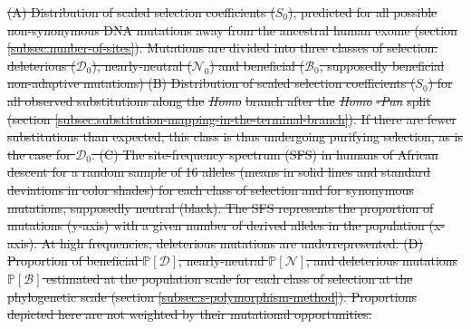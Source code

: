 \documentclass{article} %
\newcommand{\proba}{\mathbb{P}}
\newcommand{\Sphy}{S_{0}}
\newcommand{\SphyDel}{\mathcal{D}_0}
\newcommand{\SphyNeu}{\mathcal{N}_0}
\newcommand{\SphyBen}{\mathcal{B}_0}
\newcommand{\SpopDel}{\mathcal{D}}
\newcommand{\SpopNeu}{\mathcal{N}}
\newcommand{\SpopBen}{\mathcal{B}}
\newcommand{\ProbaPopDel}{\proba [ \SpopDel]}
\newcommand{\ProbaPopNeu}{\proba [ \SpopNeu ]}
\newcommand{\ProbaPopBen}{\proba [ \SpopBen ]}
\providecommand{\DIFdeltex}[1]{{\protect\color{red}\sout{#1}}}                      %
\providecommand{\DIFdelbegin}{} %
\providecommand{\DIFdelFL}[1]{\DIFdel{#1}} %
\providecommand{\DIFdel}[1]{\texorpdfstring{\DIFdeltex{#1}}{}} %
\newcommand{\DIFscaledelfig}{0.5}
\newlength{\DIFdelgraphicswidth} %
\newlength{\DIFdelgraphicsheight} %
\newcommand{\DIFdelincludegraphics}[2][]{%
\sbox{\DIFdelgraphicsbox}{\DIFOincludegraphics[#1]{#2}}%
\settoboxwidth{\DIFdelgraphicswidth}{\DIFdelgraphicsbox} %
\settoboxtotalheight{\DIFdelgraphicsheight}{\DIFdelgraphicsbox} %
\scalebox{\DIFscaledelfig}{%
\parbox[b]{\DIFdelgraphicswidth}{\usebox{\DIFdelgraphicsbox}\\[-\baselineskip] \rule{\DIFdelgraphicswidth}{0em}}\llap{\resizebox{\DIFdelgraphicswidth}{\DIFdelgraphicsheight}{%
\setlength{\unitlength}{\DIFdelgraphicswidth}%
\begin{picture}(1,1)%
\thicklines\linethickness{2pt} %
{\color[rgb]{1,0,0}\put(0,0){\framebox(1,1){}}}%
{\color[rgb]{1,0,0}\put(0,0){\line( 1,1){1}}}%
{\color[rgb]{1,0,0}\put(0,1){\line(1,-1){1}}}%
\end{picture}%
}\hspace*{3pt}}} %
} %
\DeclareRobustCommand{\DIFdelbegin}{\DIFOdelbegin \let\includegraphics\DIFdelincludegraphics} %
\begin{document}
    \DIFdelbegin %
{%
\DIFdelFL{(A) Distribution of scaled selection coefficients ($\Sphy$), predicted for all possible non-synonymous DNA mutations away from the ancestral human exome (section \ref{subsec:nunber-of-sites}).
              Mutations are divided into three classes of selection: deleterious ($\SphyDel$), nearly-neutral ($\SphyNeu$) and beneficial ($\SphyBen$, supposedly beneficial non-adaptive mutations)
              (B) Distribution of scaled selection coefficients ($\Sphy$) for all observed substitutions along the }\textit{\DIFdelFL{Homo}} %
\DIFdelFL{branch after the }\textit{\DIFdelFL{Homo}}%
\DIFdelFL{-}\textit{\DIFdelFL{Pan}} %
\DIFdelFL{split (section \ref{subsec:substitution-mapping-in-the-terminal-branch}).
              If there are fewer substitutions than expected, this class is thus undergoing purifying selection, as is the case for $\SphyDel$.
              (C) The site-frequency spectrum (SFS) in humans of African descent for a random sample of 16 alleles (means in solid lines and standard deviations in color shades) for each class of selection and for synonymous mutations, supposedly neutral (black). The SFS represents the proportion of mutations (y-axis) with a given number of derived alleles in the population (x-axis).
              At high frequencies, deleterious mutations are underrepresented.
              (D) Proportion of beneficial $\ProbaPopDel$, nearly-neutral $\ProbaPopNeu$, and deleterious mutations $\ProbaPopBen$ estimated at the population scale for each class of selection at the phylogenetic scale (section \ref{subsec:s-polymorphism-method}). Proportions depicted here are not weighted by their mutational opportunities.
       }}
\end{document}
